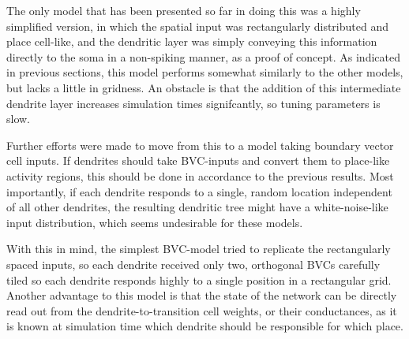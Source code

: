 \documentclass{article}
\begin{document}
    The only model that has been presented so far in doing this was a highly simplified version, in which the spatial input was rectangularly distributed and place cell-like, and the dendritic layer was simply conveying this information directly to the soma in a non-spiking manner, as a proof of concept. As indicated in previous sections, this model performs somewhat similarly to the other models, but lacks a little in gridness. An obstacle is that the addition of this intermediate dendrite layer increases simulation times signifcantly, so tuning parameters is slow.

    Further efforts were made to move from this to a model taking boundary vector cell inputs. If dendrites should take BVC-inputs and convert them to place-like activity regions, this should be done in accordance to the previous results. Most importantly, if each dendrite responds to a single, random location independent of all other dendrites, the resulting dendritic tree might have a white-noise-like input distribution, which seems undesirable for these models.

    With this in mind, the simplest BVC-model tried to replicate the rectangularly spaced inputs, so each dendrite received only two, orthogonal BVCs carefully tiled so each dendrite responds highly to a single position in a rectangular grid. Another advantage to this model is that the state of the network can be directly read out from the dendrite-to-transition cell weights, or their conductances, as it is known at simulation time which dendrite should be responsible for which place.
    
    

\end{document}
